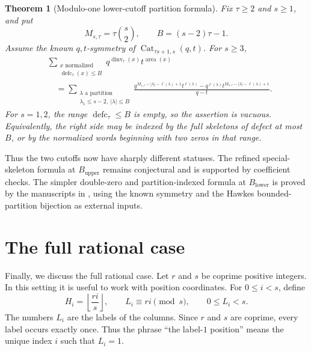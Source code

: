\documentclass[11pt]{article}
\newcommand{\area}{\operatorname{area}}
\newcommand{\dinv}{\operatorname{dinv}}
\newcommand{\defc}{\operatorname{defc}}
\newtheorem{theorem}{Theorem}
\begin{document}
\begin{theorem}[Modulo-one lower-cutoff partition formula]
Fix \(\tau\ge2\) and \(s\ge1\), and put
\[
 M_{s,\tau}=\tau\binom{s}{2},
 \qquad B=(s-2)\tau-1.
\]
Assume the known \(q,t\)-symmetry of
\(\operatorname{Cat}_{\tau s+1,s}(q,t)\).  For \(s\ge3\),
\begin{align*}
 &\sum_{\substack{x\text{ normalized}\\\defc_\tau(x)\le B}}
 q^{\dinv_\tau(x)}t^{\area(x)}\\
 &\quad=
 \sum_{\substack{\lambda\text{ a partition}\\
                 \lambda_1\le s-2,\ |\lambda|\le B}}
 \frac{
 q^{M_{s,\tau}-|\lambda|-\ell(\lambda)+1}t^{\ell(\lambda)}
 -
 q^{\ell(\lambda)}
 t^{M_{s,\tau}-|\lambda|-\ell(\lambda)+1}
 }{q-t}.
\end{align*}
For \(s=1,2\), the range \(\defc_\tau\le B\) is empty, so the assertion is
vacuous.  Equivalently, the right side may be indexed by the full skeletons
of defect at most \(B\), or by the normalized words beginning with two zeros
in that range.
\end{theorem}

Thus the two cutoffs now have sharply different statuses.  The refined
special-skeleton formula at \(B_{\mathrm{upper}}\) remains conjectural and
is supported by coefficient checks.  The simpler double-zero and
partition-indexed formula at \(B_{\mathrm{lower}}\) is proved by the
manuscripts in , using the known symmetry and the
Hawkes bounded-partition bijection as external inputs.

\section{The full rational case}

Finally, we discuss the full rational case.  Let \(r\) and \(s\) be coprime
positive integers.  In this setting it is useful to work with position
coordinates.  For \(0\le i<s\), define
\[
  H_i=\left\lfloor \frac{ri}{s}\right\rfloor,
  \qquad
  L_i\equiv ri \pmod s,\qquad 0\le L_i<s.
\]
The numbers \(L_i\) are the labels of the columns.  Since \(r\) and \(s\) are
coprime, every label occurs exactly once.  Thus the phrase ``the label-\(1\)
position'' means the unique index \(i\) such that \(L_i=1\).
\end{document}
